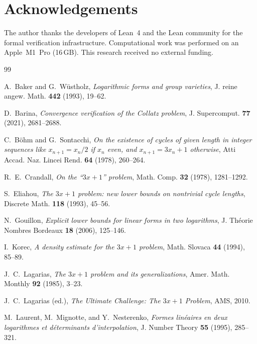 \documentclass[11pt, a4paper]{amsart}
\theoremstyle{plain}
\theoremstyle{definition}
\theoremstyle{remark}
\begin{document}
\section*{Acknowledgements}

The author thanks the developers of Lean~4 and the Lean
community for the formal verification infrastructure.
Computational work was performed on an Apple~M1~Pro (16\,GB).
This research received no external funding.

\begin{thebibliography}{99}

A.~Baker and G.~W\"ustholz,
\emph{Logarithmic forms and group varieties},
J. reine angew. Math. \textbf{442} (1993), 19--62.

D.~Barina,
\emph{Convergence verification of the Collatz problem},
J. Supercomput. \textbf{77} (2021), 2681--2688.

C.~B\"ohm and G.~Sontacchi,
\emph{On the existence of cycles of given length in integer
sequences like $x_{n+1} = x_n/2$ if $x_n$ even, and
$x_{n+1} = 3x_n + 1$ otherwise},
Atti Accad. Naz. Lincei Rend. \textbf{64} (1978), 260--264.

R.~E.~Crandall,
\emph{On the ``$3x + 1$'' problem},
Math. Comp. \textbf{32} (1978), 1281--1292.

S.~Eliahou,
\emph{The $3x + 1$ problem: new lower bounds on nontrivial
cycle lengths},
Discrete Math. \textbf{118} (1993), 45--56.

N.~Gouillon,
\emph{Explicit lower bounds for linear forms in two logarithms},
J. Th\'eorie Nombres Bordeaux \textbf{18} (2006), 125--146.

I.~Korec,
\emph{A density estimate for the $3x + 1$ problem},
Math. Slovaca \textbf{44} (1994), 85--89.

J.~C.~Lagarias,
\emph{The $3x + 1$ problem and its generalizations},
Amer. Math. Monthly \textbf{92} (1985), 3--23.

J.~C.~Lagarias (ed.),
\emph{The Ultimate Challenge: The $3x + 1$ Problem},
AMS, 2010.

M.~Laurent, M.~Mignotte, and Y.~Nesterenko,
\emph{Formes lin\'eaires en deux logarithmes et d\'eterminants
d'interpolation},
J. Number Theory \textbf{55} (1995), 285--321.


\end{thebibliography}
\end{document}
